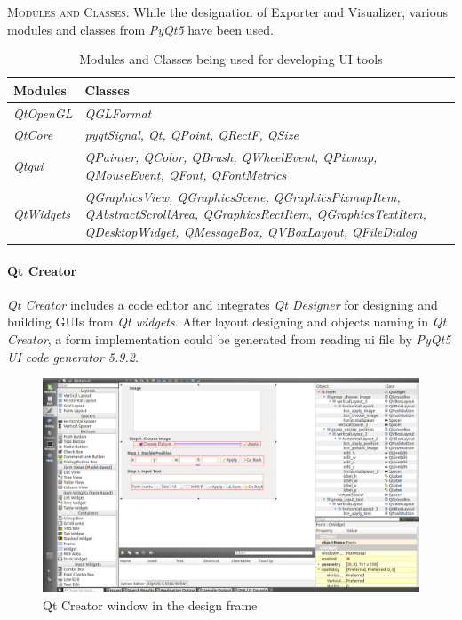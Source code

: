 \documentclass[a4paper, twoside]{report}
\begin{document}
\newpage
\noindent \textsc{Modules and Classes: } While the designation of Exporter and Visualizer, various modules and classes from \textit{PyQt5} have been used.   \\ \par
{\renewcommand{\arraystretch}{1.5}%
\begin{table}[h!]
\centering
\begin{tabular}{ m{2cm}| m{}  }
Modules & Classes \\
\hline
\textit{QtOpenGL} & \textit{QGLFormat} \\
\hline
\textit{QtCore} &\textit{pyqtSignal, Qt, QPoint, QRectF, QSize} \\
\hline
\textit{Qtgui} &\textit{QPainter, QColor, QBrush, QWheelEvent, QPixmap, QMouseEvent, QFont, QFontMetrics} \\
\hline
\textit{QtWidgets} & \textit{QGraphicsView, QGraphicsScene, QGraphicsPixmapItem, QAbstractScrollArea, QGraphicsRectItem, QGraphicsTextItem, QDesktopWidget, QMessageBox, QVBoxLayout, QFileDialog} \\
\end{tabular}
\caption{Modules and Classes being used for developing UI tools}
\end{table} \quad

\paragraph{Qt Creator}
\textit{Qt Creator} includes a code editor and integrates \textit{Qt Designer} for designing and building GUIs from \textit{Qt widgets}. After layout designing and objects naming in \textit{Qt Creator}, a form implementation could be generated from reading ui file by \textit{PyQt5 UI code generator 5.9.2}. \\ \par

\begin{figure}[h!]
\centering
\includegraphics[width=.9\textwidth]{qt_creator.png}
\caption{Qt Creator window in the design frame}
\end{figure}

}
\end{document}
